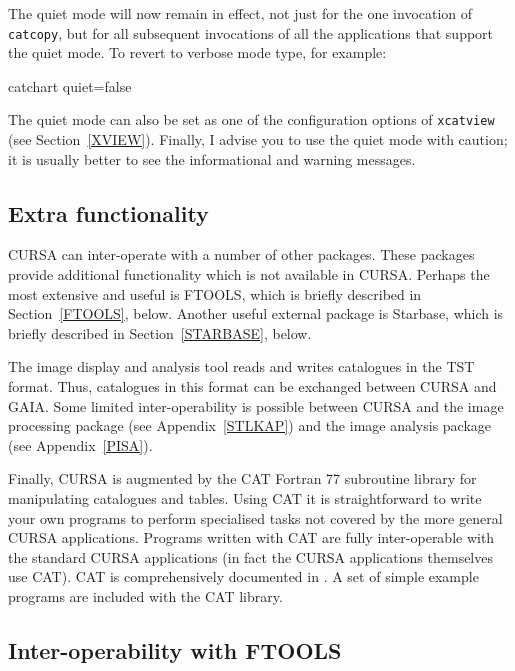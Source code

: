 \documentclass[twoside,11pt]{starlink}
\begin{document}
The quiet mode will now remain in effect, not just for the one invocation
of \texttt{catcopy}, but for all subsequent invocations of all the applications
that support the quiet mode.  To revert to verbose mode type, for example:

\begin{terminalv}
catchart  quiet=false
\end{terminalv}

The quiet mode can also be set as one of the configuration options
of \texttt{xcatview} (see Section~\ref{XVIEW}).  Finally, I advise you to
use the quiet mode with caution; it is usually better to see the
informational and warning messages.

\subsection{Extra functionality}

CURSA can inter-operate with a number of other packages.  These
packages provide additional functionality which is not available in
CURSA.  Perhaps the most extensive and useful is FTOOLS, which is
briefly described in Section~\ref{FTOOLS}, below.  Another useful
external package is Starbase, which is briefly described in
Section~\ref{STARBASE}, below.

The image display and analysis tool \cite{SUN214}
reads and writes catalogues in the TST format.  Thus, catalogues in
this format can be exchanged between CURSA and GAIA.  Some limited
inter-operability is possible between CURSA and the image processing
package \cite{SUN95} (see Appendix~\ref{STLKAP}) and
the image analysis package \cite{SUN109} (see
Appendix~\ref{PISA}).

Finally, CURSA is augmented by the CAT Fortran 77 subroutine library for
manipulating catalogues and tables.  Using CAT it is straightforward to
write your own programs to perform specialised tasks not covered by the
more general CURSA applications. Programs written with CAT are fully
inter-operable with the standard CURSA applications (in fact the CURSA
applications themselves use CAT). CAT is comprehensively documented in
\cite{SUN181}.  A set of simple example programs
are included with the CAT library.

\subsection{\label{FTOOLS}Inter-operability with FTOOLS}
\end{document}
